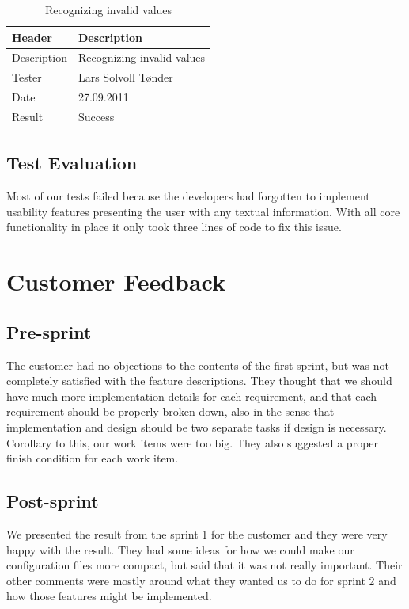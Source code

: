\begin{table}[!htb] \footnotesize \center
\caption{Recognizing invalid values \label{tab:sp1_tid07}}
\begin{tabular}{l l}
	\toprule
	Header & Description \\
	\midrule
	Description &  Recognizing invalid values  \\
	Tester & Lars Solvoll Tønder \\
	Date & 27.09.2011 \\
	Result & Success\\
	\bottomrule
\end{tabular}
\end{table}

\subsection{Test Evaluation}
Most of our tests failed because the developers had forgotten to implement
usability features presenting the user with any textual information. With all
core functionality in place it only took three lines of code to fix this issue.


\section{Customer Feedback}

\subsection{Pre-sprint}
The customer had no objections to the contents of the first sprint, but was not
completely satisfied with the feature descriptions. They thought that we should
have much more implementation details for each requirement, and that each
requirement should be properly broken down, also in the sense that
implementation and design should be two separate tasks if design is necessary.
Corollary to this, our work items were too big. They also suggested a proper
finish condition for each work item.

\subsection{Post-sprint}
We presented the result from the sprint 1 for the customer and they were very
happy with the result. They had some ideas for how we could make our
configuration files more compact, but said that it was not really important.
Their other comments were mostly around what they wanted us to do for sprint 2
and how those features might be implemented.


